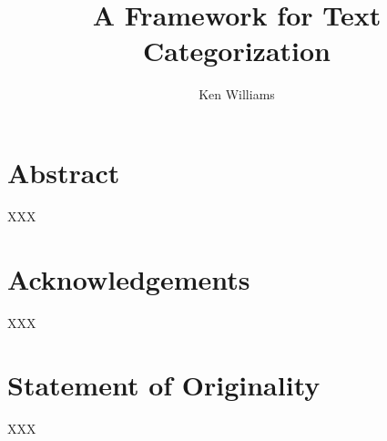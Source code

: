 \documentclass[a4paper]{report}
\title{A Framework for Text Categorization}
\author{Ken Williams}
\begin{document}
\newcommand{\method}[1]{\texttt{#1()}}
\newcommand{\class}[1]{\texttt{#1}}
\newcommand{\aicat}{\class{AI::Cat\-e\-gor\-i\-zer}}
\newcommand{\ensemble}{\class{Learn\-er::En\-sem\-ble}}

\maketitle
\chapter*{Abstract}
XXX
\chapter*{Acknowledgements}
XXX
\chapter*{Statement of Originality}
XXX
\tableofcontents










\end{document}
